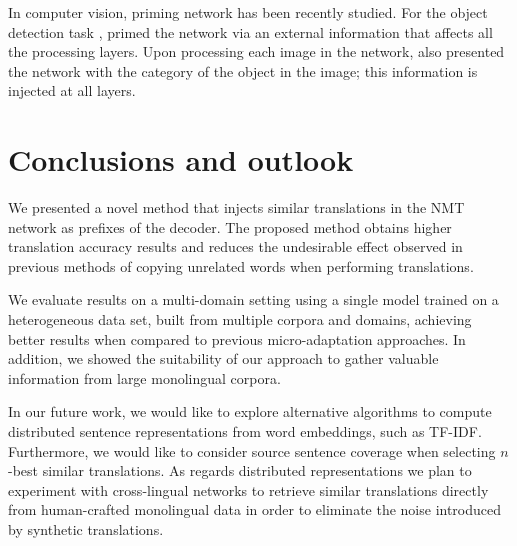 In computer vision, priming network has been recently studied. For the object detection task , \citet{Rosenfeld18Priming} primed the network via an external information that affects all the processing layers. Upon processing each image in the network, \citet{Rosenfeld18Priming} also presented the network with the category of the object in the image; this information is injected at all layers. 

\section{Conclusions and outlook}
\label{sec:conclusions-chap8}
We presented a novel method that injects similar translations in the NMT network as prefixes of the decoder. The proposed method obtains higher translation accuracy results and reduces the undesirable effect observed in previous methods of copying unrelated words when performing translations. 

We evaluate results on a multi-domain setting using a single model trained on a heterogeneous data set, built from multiple corpora and domains, achieving better results when compared to previous micro-adaptation approaches. In addition, we showed the suitability of our approach to gather valuable information from large monolingual corpora. 

In our future work, we would like to explore alternative algorithms to compute distributed sentence representations from word embeddings, such as TF-IDF. Furthermore, we would like to consider source sentence coverage when selecting $n$-best similar translations. As regards distributed representations we plan to experiment with cross-lingual networks to retrieve similar translations directly from human-crafted monolingual data in order to eliminate the noise introduced by synthetic translations.
